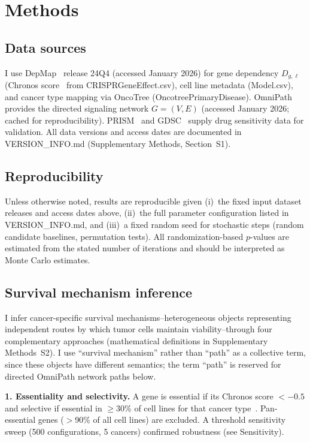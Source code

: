 \documentclass[times, twoside, watermark]{zHenriquesLab-StyleBioRxiv}
\begin{document}
\section*{Methods}

\subsection*{Data sources}
I use DepMap~\cite{Dempster2021,Tsherniak2017} release 24Q4 (accessed January 2026) for gene dependency $D_{g,\ell}$ (Chronos score~\cite{Dempster2021} from CRISPRGeneEffect.csv), cell line metadata (Model.csv), and cancer type mapping via OncoTree (OncotreePrimaryDisease). OmniPath~\cite{Turei2026} provides the directed signaling network $G = (V, E)$ (accessed January 2026; cached for reproducibility). PRISM~\cite{Corsello2020} and GDSC~\cite{Yang2013,Iorio2016} supply drug sensitivity data for validation. All data versions and access dates are documented in VERSION\_INFO.md (Supplementary Methods, Section~S1).

\subsection*{Reproducibility}
Unless otherwise noted, results are reproducible given (i)~the fixed input dataset releases and access dates above, (ii)~the full parameter configuration listed in VERSION\_INFO.md, and (iii)~a fixed random seed for stochastic steps (random candidate baselines, permutation tests). All randomization-based $p$-values are estimated from the stated number of iterations and should be interpreted as Monte Carlo estimates.

\subsection*{Survival mechanism inference}
I infer cancer-specific survival mechanisms--heterogeneous objects representing independent routes by which tumor cells maintain viability--through four complementary approaches (mathematical definitions in Supplementary Methods~S2). I use ``survival mechanism'' rather than ``path'' as a collective term, since these objects have different semantics; the term ``path'' is reserved for directed OmniPath network paths below.

\textbf{1. Essentiality and selectivity.} A gene is essential if its Chronos score $< -0.5$ and selective if essential in $\geq$30\% of cell lines for that cancer type~\cite{Dempster2021,Behan2019}. Pan-essential genes ($>$90\% of all cell lines) are excluded. A threshold sensitivity sweep (500 configurations, 5 cancers) confirmed robustness (see Sensitivity).
\end{document}
